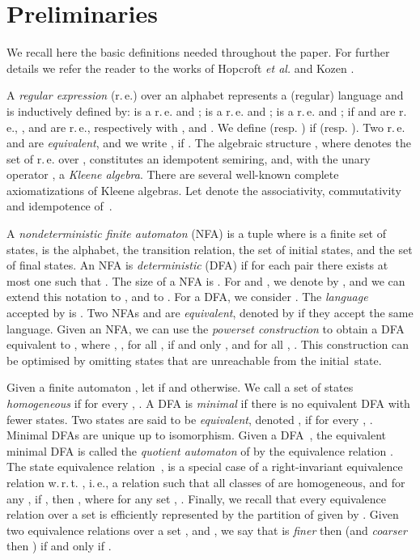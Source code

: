 \documentclass[copyright]{eptcs}
\newcommand{\dfa}{DFA\xspace}
\newcommand{\dfas}{DFAs\xspace}
\newcommand{\nfa}{NFA\xspace}
\newcommand{\nfas}{NFAs\xspace}
\newcommand{\ACI}{\xspace}
\newcommand{\re}{r.\,e.\xspace}
\newcommand{\ie}{i.\,e.}
\begin{document}
\section{Preliminaries}\label{sec:pre}
We recall here the basic definitions needed throughout the paper.
For further details we refer the reader to the works of Hopcroft
\emph{et al.}  \cite{hopcroft00_c:_introd_autom_theor_languag_comput}
and Kozen \cite{kozen97:_autom_comput}.

 A \emph{regular expression} (\re)
 over an alphabet  represents a (regular) language
 and is inductively defined by:
 is a \re and ;  is a \re
and ;  is a \re and
; if  and  are \re, ,  and  are \re,
respectively with ,  and
. We define 
(resp. ) if 
(resp. ). Two \re  and  are
\emph{equivalent}, and we write , if
.
The algebraic structure , where 
denotes the set of \re over , constitutes an idempotent
semiring, and, with the unary operator , a \emph{Kleene
  algebra}. There are several well-known complete axiomatizations of
Kleene 
 algebras. Let \ACI denote the associativity, commutativity and idempotence
of~.

A \emph{nondeterministic finite automaton} (\nfa)  is a tuple
 where  is a finite set of states,  is
the alphabet,  the
transition relation,  the set of initial states, and  the set of final states.  An \nfa is \emph{deterministic}
(\dfa) if for each pair  there exists at
most one  such that . The size of a \nfa is . For  and , we denote by
, and we can extend this
notation to , and to . For a \dfa, we
consider .  The
\emph{language} accepted by  is . Two \nfas  and  are
\emph{equivalent}, denoted by  if they accept the same
language. Given an \nfa , we can use
the \emph{powerset construction} to obtain a \dfa{}  equivalent to , where , , for all ,  if and only , and for all , . This construction can be optimised by
omitting states  that are unreachable from the initial~state.


Given a finite automaton , let 
if  and  otherwise. We call a set of states
 \emph{homogeneous} if for every \hbox{},
\hbox{}. A \dfa is \emph{minimal} if there is no
equivalent \dfa with fewer states. Two states  are
said to be \emph{equivalent}, denoted , if for every , . Minimal \dfas are unique up to isomorphism. Given a \dfa~,
the equivalent minimal \dfa  is called the
\emph{quotient automaton} of  by the equivalence relation  .  
The state equivalence relation~,
is a special case of a right-invariant equivalence relation
w.\,r.\,t. , \ie, a relation  such that
all classes of  are homogeneous, and for any ,
 if , then , where for any set ,
.  Finally, we recall that every
equivalence relation  over a set  is efficiently
represented by the partition of  given by .  Given two
equivalence relations over a set ,  and , we
say that  is \emph{finer} then  (and 
\emph{coarser} then ) if and only if .
\end{document}
